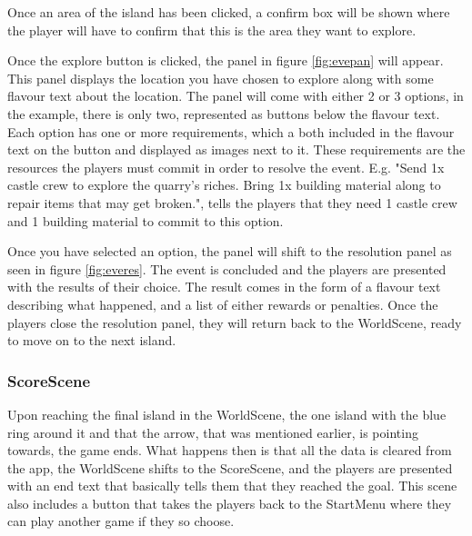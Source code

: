 Once an area of the island has been clicked, a confirm box will be shown where the player will have to confirm that this is the area they want to explore. 

Once the explore button is clicked, the panel in figure \ref{fig:evepan} will appear. 
This panel displays the location you have chosen to explore along with some flavour text about the location. 
The panel will come with either 2 or 3 options, in the example, there is only two, represented as buttons below the flavour text. 
Each option has one or more requirements, which a both included in the flavour text on the button and displayed as images next to it. These requirements are the resources the players must commit in order to resolve the event. 
E.g. "Send 1x castle crew to explore the quarry's riches. Bring 1x building material along to repair items that may get broken.", tells the players that they need 1 castle crew and 1 building material to commit to this option.

Once you have selected an option, the panel will shift to the resolution panel as seen in figure \ref{fig:everes}. The event is concluded and the players are presented with the results of their choice. The result comes in the form of a flavour text describing what happened, and a list of either rewards or penalties.
Once the players close the resolution panel, they will return back to the WorldScene, ready to move on to the next island.

\subsubsection{ScoreScene}
Upon reaching the final island in the WorldScene, the one island with the blue ring around it and that the arrow, that was mentioned earlier, is pointing towards, the game ends. 
What happens then is that all the data is cleared from the app, the WorldScene shifts to the ScoreScene, and the players are presented with an end text that basically tells them that they reached the goal. This scene also includes a button that takes the players back to the StartMenu where they can play another game if they so choose.

